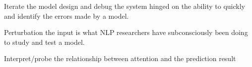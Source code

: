 
Iterate the model design and debug the system hinged on the ability to quickly and identify the errors made by a model.

Perturbation the input is what NLP researchers have subconsciously been doing to study and test a model.

Interpret/probe the relationship between attention and the prediction result





